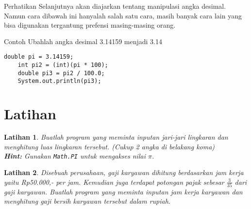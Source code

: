 \documentclass[aspectratio=169]{beamer}
\newtheorem{latihan}{Latihan}
\theoremstyle{definition}
\begin{document}
    {
    \begin{frame}
        \begin{alertblock}{Perhatikan}
            Selanjutnya akan diajarkan tentang manipulasi angka desimal. Namun cara dibawah ini hanyalah salah satu cara, masih banyak cara lain yang bisa digunakan tergantung prefensi masing-masing orang.
        \end{alertblock}
    \end{frame}
    }

    \begin{frame}[fragile]
        \begin{exampleblock}{Contoh}
            Ubahlah angka desimal 3.14159 menjadi 3.14
        \end{exampleblock}
        \begin{lstlisting}[caption={Manipulasi Angka Desimal}]
    double pi = 3.14159;
    int pi2 = (int)(pi * 100);
    double pi3 = pi2 / 100.0;
    System.out.println(pi3);            
        \end{lstlisting}
    \end{frame}

    \section{Latihan}
    \begin{frame}
        \begin{latihan}
            Buatlah program yang meminta inputan jari-jari lingkaran dan menghitung luas lingkaran tersebut. (Cukup 2 angka di belakang koma)\\

            \textbf{Hint:} Gunakan \texttt{Math.PI} untuk mengakses nilai $\pi$.
        \end{latihan}
        \begin{latihan}
            Disebuah perusahaan, gaji karyawan dihitung berdasarkan jam kerja yaitu Rp50.000,- per jam. Kemudian juga terdapat potongan pajak sebesar $\displaystyle\frac{3}{35}$ dari gaji karyawan. Buatlah program yang meminta inputan jam kerja karyawan dan menghitung gaji bersih karyawan tersebut dalam rupiah.
        \end{latihan}
    \end{frame}
\end{document}
